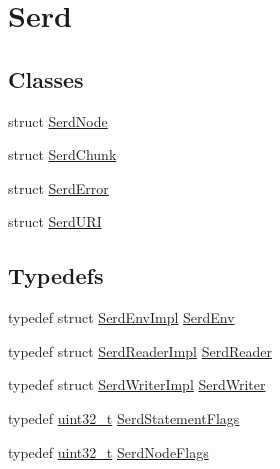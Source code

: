 \hypertarget{group__serd}{}\section{Serd}
\label{group__serd}
\subsection*{Classes}
\begin{DoxyCompactItemize}
\item 
struct \hyperlink{struct_serd_node}{Serd\+Node}
\item 
struct \hyperlink{struct_serd_chunk}{Serd\+Chunk}
\item 
struct \hyperlink{struct_serd_error}{Serd\+Error}
\item 
struct \hyperlink{struct_serd_u_r_i}{Serd\+U\+RI}
\end{DoxyCompactItemize}
\subsection*{Typedefs}
\begin{DoxyCompactItemize}
\item 
typedef struct \hyperlink{struct_serd_env_impl}{Serd\+Env\+Impl} \hyperlink{group__serd_gaea4226dd80abea7afa05986f195d4755}{Serd\+Env}
\item 
typedef struct \hyperlink{struct_serd_reader_impl}{Serd\+Reader\+Impl} \hyperlink{group__serd_ga69c709eacb062f9e7777726ec80b2796}{Serd\+Reader}
\item 
typedef struct \hyperlink{struct_serd_writer_impl}{Serd\+Writer\+Impl} \hyperlink{group__serd_gaaaa09490e19dff0180251f1e2524e6f0}{Serd\+Writer}
\item 
typedef \hyperlink{lib-src_2ffmpeg_2win32_2stdint_8h_a6eb1e68cc391dd753bc8ce896dbb8315}{uint32\+\_\+t} \hyperlink{group__serd_ga77f5ab7cef4fbc88591eaa9970fcddad}{Serd\+Statement\+Flags}
\item 
typedef \hyperlink{lib-src_2ffmpeg_2win32_2stdint_8h_a6eb1e68cc391dd753bc8ce896dbb8315}{uint32\+\_\+t} \hyperlink{group__serd_gafa75ae761bd7490db787b2f9e237595a}{Serd\+Node\+Flags}
\end{DoxyCompactItemize}
